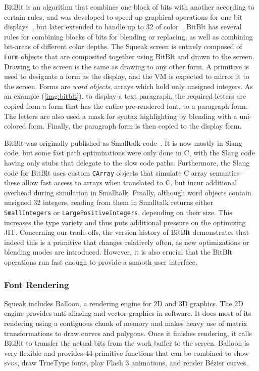 \documentclass[
10pt,          %
]{sigplanconf}
\begin{document}
BitBlt is an algorithm that combines one block of bits with another according
to certain rules, and was developed to speed up graphical operations for one
bit displays~\cite{GuibasBitBlt}, but later extended to handle up to
\SI{32}{\bit} of color~\cite{BackToTheFuture}. BitBlt has several rules for
combining blocks of bits for blending or replacing, as well as combining
bit-areas of different color depths. The Squeak screen is entirely composed of
\verb!Form! objects that are composited together using BitBlt and drawn to the
screen. Drawing to the screen is the same as drawing to any other form. A
primitive is used to designate a form as the display, and the \ac{VM} is
expected to mirror it to the screen. Forms are \emph{word objects}, arrays
which hold only unsigned integers. As an example (\autoref{img:bitblt}), to
display a text paragraph, the required letters are copied from a form that has
the entire pre-rendered font, to a paragraph form. The letters are also used a mask
for syntax highlighting by blending with a uni-colored form. Finally, the
paragraph form is then copied to the display form.

BitBlt was originally published as Smalltalk code~\cite{BlueBook}. It is now
mostly in Slang code, but some fast path optimizations were only done in C,
with the Slang code having only stubs that delegate to the slow code paths.
Furthermore, the Slang code for BitBlt uses custom \verb!CArray! objects that
simulate C array semantics\---these allow fast access to arrays when translated
to C, but incur additional overhead during simulation in Smalltalk. Finally,
although word objects contain unsigned \SI{32}{\bit} integers, reading from
them in Smalltalk returns either \verb!SmallIntegers! or \verb!LargePositiveIntegers!,
depending on their size. This increases the type variety and thus puts
additional pressure on the optimizing \ac{JIT}. Concerning our trade-offs, the
version history of BitBlt demonstrates that indeed this is a primitive that
changes relatively often, as new optimizations or blending modes are
introduced. However, it is also crucial that the BitBlt operations run fast
enough to provide a smooth user interface.


\subsubsection{Font Rendering}

Squeak includes Balloon, a rendering engine for 2D and 3D
graphics. The 2D engine provides anti-aliasing and vector graphics in
software. It does most of its rendering using a contiguous chunk of
memory and makes heavy use of matrix transformations to draw curves
and polygons. Once it finishes rendering, it calls BitBlt to transfer
the actual bits from the work buffer to the screen. Balloon is very
flexible and provides 44 primitive functions that can be combined to
show \textsc{svg}s, draw TrueType fonts, play Flash 3 animations, and
render Bézier curves.
\end{document}
